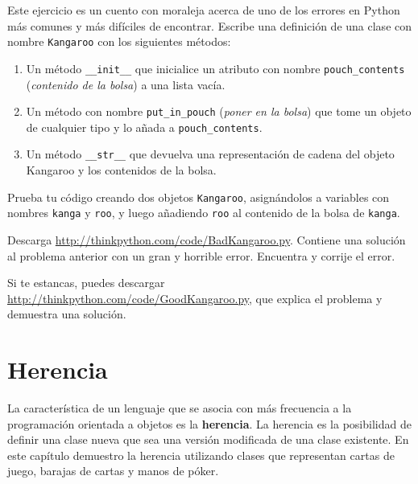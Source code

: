 \documentclass[10pt]{book}
\begin{document}
\begin{exercise}
\label{kangaroo}

Este ejercicio es un cuento con moraleja acerca de uno de los errores
en Python más comunes y más difíciles de encontrar.
Escribe una definición de una clase con nombre {\tt Kangaroo} con los siguientes
métodos:

\begin{enumerate}

\item Un método \verb"__init__" que inicialice un atributo con nombre
\verb"pouch_contents" ({\em contenido de la bolsa}) a una lista vacía.

\item Un método con nombre \verb"put_in_pouch" ({\em poner en la bolsa}) que tome un objeto
de cualquier tipo y lo añada a \verb"pouch_contents".

\item Un método \verb"__str__" que devuelva una representación de cadena
del objeto Kangaroo y los contenidos de la bolsa.

\end{enumerate}
%
Prueba tu código
creando dos objetos {\tt Kangaroo}, asignándolos a variables
con nombres {\tt kanga} y {\tt roo}, y luego añadiendo {\tt roo} al
contenido de la bolsa de {\tt kanga}.

Descarga \url{http://thinkpython.com/code/BadKangaroo.py}.  Contiene
una solución al problema anterior con un gran y horrible error.
Encuentra y corrije el error.

Si te estancas, puedes descargar
\url{http://thinkpython.com/code/GoodKangaroo.py}, que explica el
problema y demuestra una solución.

\end{exercise}



\chapter{Herencia}

La característica de un lenguaje que se asocia con más frecuencia a la programación
orientada a objetos es la {\bf herencia}.  La herencia es la posibilidad de
definir una clase nueva que sea una versión modificada de una clase existente.
En este capítulo demuestro la herencia utilizando clases que representan
cartas de juego, barajas de cartas y manos de póker.
\end{document}
